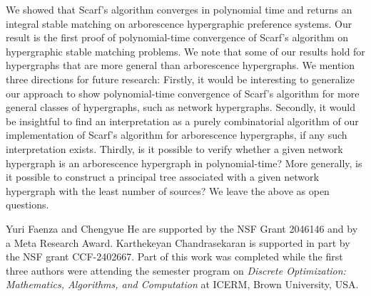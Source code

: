 \documentclass[11pt]{article}
\begin{document}
We showed that Scarf's algorithm converges in polynomial time and returns an integral stable matching on arborescence hypergraphic preference systems. Our result is the first proof of polynomial-time convergence of Scarf's algorithm on hypergraphic stable matching problems. We note that some of our results hold for hypergraphs that are more general than arborescence hypergraphs. We mention three directions for future research: Firstly, it would be interesting to generalize our approach to show  polynomial-time convergence of Scarf's algorithm for more general classes of hypergraphs, such as network hypergraphs. Secondly, it would be insightful to find an interpretation as a purely combinatorial algorithm of our implementation of Scarf's algorithm for arborescence hypergraphs, if any such interpretation exists. Thirdly, is it possible to verify whether a given network hypergraph is an arborescence hypergraph in polynomial-time? More generally, is it possible to construct a principal tree associated with a given network hypergraph with the least number of sources? We leave the above as open questions.

\medskip

 Yuri Faenza and Chengyue He are supported by the NSF Grant 2046146 and by a Meta Research Award. Karthekeyan Chandrasekaran is supported in part by the NSF grant CCF-2402667. Part of this work was completed while the first three authors were attending the semester program on \emph{Discrete Optimization: Mathematics, Algorithms, and Computation} at ICERM, Brown University, USA.






\end{document}
